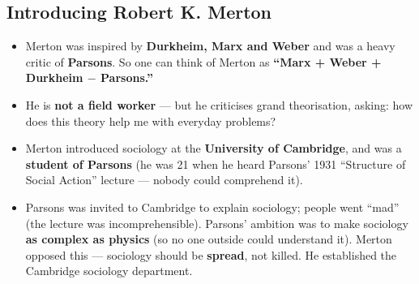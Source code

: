 \sectiondivider

\subsection{Introducing Robert K. Merton}

\begin{KeyConcept}
\begin{itemize}
\item Merton was inspired by \textbf{Durkheim, Marx and Weber} and was a heavy critic of \textbf{Parsons}. So one can think of Merton as \textbf{``Marx + Weber + Durkheim $-$ Parsons.''}
\item He is \textbf{not a field worker} --- but he criticises grand theorisation, asking: how does this theory help me with everyday problems?
\end{itemize}
\end{KeyConcept}

\begin{DataFact}
\begin{itemize}
\item Merton introduced sociology at the \textbf{University of Cambridge}, and was a \textbf{student of Parsons} (he was 21 when he heard Parsons' 1931 ``Structure of Social Action'' lecture --- nobody could comprehend it).
\item Parsons was invited to Cambridge to explain sociology; people went ``mad'' (the lecture was incomprehensible). Parsons' ambition was to make sociology \textbf{as complex as physics} (so no one outside could understand it). Merton opposed this --- sociology should be \textbf{spread}, not killed. He established the Cambridge sociology department.
\end{itemize}
\end{DataFact}

